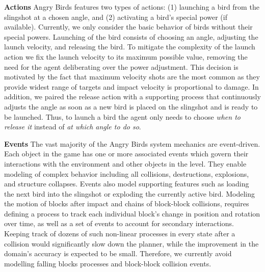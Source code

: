 \documentclass[letterpaper]{article} %
\begin{document}
\noindent\textbf{Actions}
Angry Birds features two types of actions: (1) launching a bird from the slingshot at a chosen angle, and (2) activating a bird's special power (if available).
Currently, we only consider the basic behavior of birds without their special powers.
Launching of the bird consists of
choosing an angle, adjusting the launch velocity, and releasing the bird.
To mitigate the complexity of the launch action we fix the launch velocity to its maximum possible value, removing the need for the agent deliberating over the power adjustment.
This decision is motivated by the fact that maximum velocity shots are the most common as they provide widest range of targets and impact velocity is proportional to damage.
In addition, we paired the release action with a supporting process that continuously adjusts the angle as soon as a new bird is placed on the slingshot and is ready to be launched.
Thus, to launch a bird the agent only needs to choose \textit{when to release it} instead of \textit{at which angle to do so}.















\noindent\textbf{Events}
The vast majority of the Angry Birds system mechanics are event-driven.
\vspace{-1.71mm}
Each object in the game has one or more associated events which govern their interactions with the environment and other objects in the level.
They enable modeling of complex behavior including all collisions, destructions, explosions, and structure collapses. Events also model supporting features such as loading the next bird into the slingshot or exploding the currently active bird.
Modeling the motion of blocks after impact and chains of block-block collisions, requires defining a process to track each individual block's change in position and rotation over time, as well as a set of events to account for secondary interactions.
Keeping track of dozens of such non-linear processes in every state after a collision would significantly slow down the planner, while the improvement in the domain's accuracy is expected to be small.
Therefore, we currently avoid modelling falling blocks processes and block-block collision events. %
\end{document}
